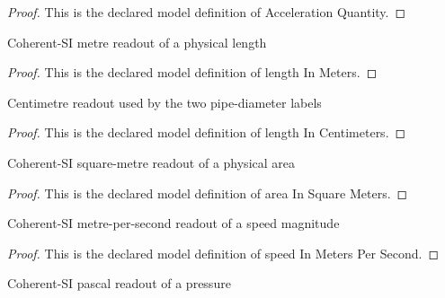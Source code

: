 \begin{proof}
  This is the declared model definition of Acceleration Quantity.
\end{proof}
\begin{definition}
  \label{def:physics:phyx-mini-0724:phyxminiproblems-problemphyxmini0724-lengthinmeters}
  Coherent-SI metre readout of a physical length
\end{definition}
\begin{proof}
  This is the declared model definition of length In Meters.
\end{proof}
\begin{definition}
  \label{def:physics:phyx-mini-0724:phyxminiproblems-problemphyxmini0724-lengthincentimeters}
  Centimetre readout used by the two pipe-diameter labels
\end{definition}
\begin{proof}
  This is the declared model definition of length In Centimeters.
\end{proof}
\begin{definition}
  \label{def:physics:phyx-mini-0724:phyxminiproblems-problemphyxmini0724-areainsquaremeters}
  Coherent-SI square-metre readout of a physical area
\end{definition}
\begin{proof}
  This is the declared model definition of area In Square Meters.
\end{proof}
\begin{definition}
  \label{def:physics:phyx-mini-0724:phyxminiproblems-problemphyxmini0724-speedinmeterspersecond}
  Coherent-SI metre-per-second readout of a speed magnitude
\end{definition}
\begin{proof}
  This is the declared model definition of speed In Meters Per Second.
\end{proof}
\begin{definition}
  \label{def:physics:phyx-mini-0724:phyxminiproblems-problemphyxmini0724-pressureinpascals}
  Coherent-SI pascal readout of a pressure
\end{definition}
